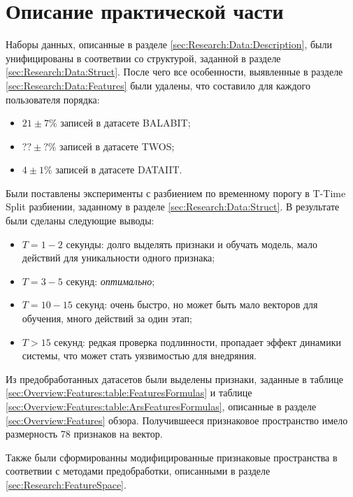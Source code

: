 \documentclass[12pt]{article}
\begin{document}
    \newpage



    \section{Описание практической части}
    \label{sec:PracticalPart}

    \par Наборы данных, описанные в разделе  \ref{sec:Research:Data:Description}, были унифицированы в соответвии со структурой, заданной в разделе \ref{sec:Research:Data:Struct}. После чего все особенности, выявленные в разделе \ref{sec:Research:Data:Features} были удалены, что составило для каждого пользователя порядка:
    \begin{itemize}
        \item $ 21 \pm 7 \% $ записей в датасете BALABIT;
        \item $ ?? \pm ? \% $ записей в датасете TWOS; 
        \item $  4 \pm 1 \% $ записей в датасете DATAIIT.
    \end{itemize}

    \par Были поставлены эксперименты с разбиением по временному порогу в T-Time Split разбиении, заданному в разделе \ref{sec:Research:Data:Struct}. В результате были сделаны следующие выводы:
    \begin{itemize}
        \item $T=1-2$ секунды: долго выделять признаки и обучать модель, мало действий для уникальности одного признака;
        \item $T=3-5$ секунд: \textit{оптимально};
        \item $T=10-15$ секунд: очень быстро, но может быть мало векторов для обучения, много действий за один этап;
        \item $T > 15$ секунд: редкая проверка подлинности, пропадает эффект динамики системы, что может стать уязвимостью для внедряния.
    \end{itemize}

    \par Из предобработанных датасетов были выделены признаки, заданные в таблице \ref{sec:Overview:Features:table:FeaturesFormulas} и таблице \ref{sec:Overview:Features:table:ArsFeaturesFormulas}, описанные в разделе \ref{sec:Overview:Features} обзора. Получившееся признаковое пространство имело размерность 78 признаков на вектор.

    \par Также были сформированны модифицированные признаковые пространства в соответвии с методами предобработки, описанными в разделе \ref{sec:Research:FeatureSpace}.
\end{document}
